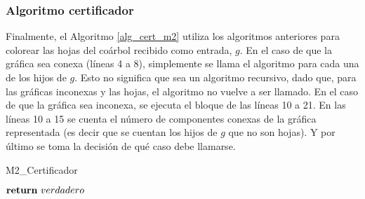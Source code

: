 \subsubsection{Algoritmo certificador}

Finalmente, el Algoritmo \ref{alg_cert_m2} utiliza los algoritmos anteriores para colorear las hojas del coárbol recibido como entrada, $g$. En el caso de que la gráfica sea conexa (líneas 4 a 8), simplemente se llama el algoritmo para cada una de los hijos de $g$. Esto no significa que sea un algoritmo recursivo, dado que, para las gráficas inconexas y las hojas, el algoritmo no vuelve a ser llamado. En el caso de que la gráfica sea inconexa, se ejecuta el bloque de las líneas 10 a 21. En las líneas 10 a 15 se cuenta el número de componentes conexas de la gráfica representada (es decir que se cuentan los hijos de $g$ que no son hojas). Y por último se toma la decisión de qué caso debe llamarse.


\begin{algorithm}[!htbp]
\caption{M2\_Certificador}
\label{alg_cert_m2}

\DontPrintSemicolon %



$\Return\ verdadero$\;

\end{algorithm}